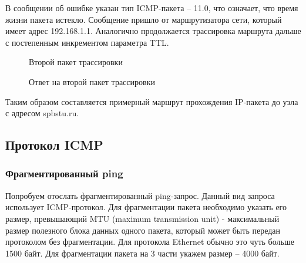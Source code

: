 \documentclass[a4paper, 14pt,russian]{article}
\begin{document}
	В сообщении об ошибке указан тип ICMP-пакета – 11.0, что означает, что время жизни пакета истекло. Сообщение пришло от маршрутизатора сети, который имеет адрес 192.168.1.1. 
	Аналогично продолжается трассировка маршрута дальше с постепенным инкрементом параметра TTL.
	
	\newpage
	\begin{figure}[h!]
		\caption{Второй пакет трассировки}
		\label{img:tracert_ans}
	\end{figure}

	\begin{figure}[h!]
		\caption{Ответ на второй пакет трассировки}
		\label{img:tracert_ans}
	\end{figure}

	 Таким образом составляется примерный маршрут прохождения IP-пакета до узла с адресом spbstu.ru.

\subsection{Протокол ICMP}
	\subsubsection{Фрагментированный ping}
		Попробуем отослать фрагментированный ping-запрос. Данный вид запроса использует ICMP-протокол. Для фрагментации пакета необходимо указать его размер, превышающий MTU (maximum transmission unit) - максимальный размер полезного блока данных одного пакета, который может быть передан протоколом без фрагментации. Для протокола Ethernet обычно это чуть больше 1500 байт. Для фрагментации пакета на 3 части укажем размер – 4000 байт.
		
\end{document}
